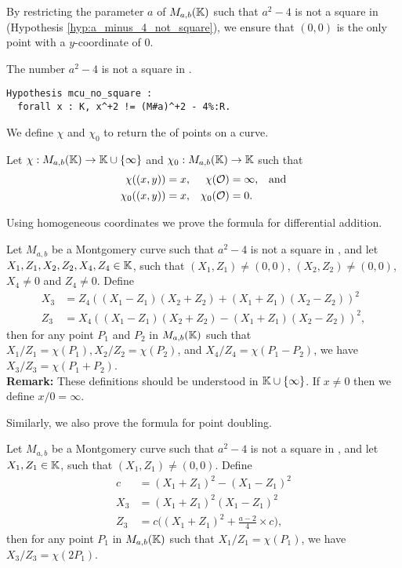 By restricting the parameter $a$ of $M_{a,b}(\mathbb{K})$ such that $a^2-4$ is not a
square in \K (Hypothesis \ref{hyp:a_minus_4_not_square}),
we ensure that $(0,0)$ is the only point with a $y$-coordinate of $0$.
\begin{hypothesis}
  \label{hyp:a_minus_4_not_square}
  The number $a^2-4$ is not a square in \K.
\end{hypothesis}
\begin{lstlisting}[language=Coq]
Hypothesis mcu_no_square :
  forall x : K, x^+2 != (M#a)^+2 - 4%:R.
\end{lstlisting}

We define $\chi$ and $\chi_0$ to return the \xcoord of points on a curve.
\begin{dfn}
    Let $\chi : M_{a,b}(\mathbb{K}) \to \mathbb{K} \cup \{\infty\}$ and $\chi_0 : M_{a,b}(\mathbb{K}) \to \mathbb{K}$ such that
    \begin{align*}
        \chi((x,y)) &= x, & \chi(\mathcal{O}) &= \infty, &&\text{and} \\
        \chi_0((x,y)) &= x, & \chi_0(\mathcal{O}) &= 0.
    \end{align*}
\end{dfn}

Using homogeneous coordinates we prove the formula for differential addition.%
\begin{lemma}
  \label{lemma:xADD}
  Let $M_{a,b}$ be a Montgomery curve such that $a^2-4$ is not a square in \K, and
  let $X_1, Z_1, X_2, Z_2, X_4, Z_4 \in \mathbb{K}$, such that $(X_1,Z_1) \neq (0,0)$,
  $(X_2,Z_2) \neq (0,0)$, $X_4 \neq 0$ and $Z_4 \neq 0$.
  Define
  \begin{align*}
    X_3 & = Z_4((X_1 - Z_1)(X_2+Z_2) + (X_1+Z_1)(X_2-Z_2))^2  \\
    Z_3 & = X_4((X_1 - Z_1)(X_2+Z_2) - (X_1+Z_1)(X_2-Z_2))^2,
  \end{align*}
  then for any point $P_1$ and $P_2$ in $M_{a,b}(\mathbb{K})$ such that
  $X_1/Z_1 = \chi(P_1), X_2/Z_2 = \chi(P_2)$, and $X_4/Z_4 = \chi(P_1 - P_2)$,
  we have $X_3/Z_3 = \chi(P_1+P_2)$.\\
  \textbf{Remark:}
  These definitions should be understood in $\mathbb{K} \cup \{\infty\}$.
  If $x\ne 0$ then we define $x/0 = \infty$.
\end{lemma}
Similarly, we also prove the formula for point doubling.%
\begin{lemma}
  \label{lemma:xDBL}
  Let $M_{a,b}$ be a Montgomery curve such that $a^2-4$ is not a square in \K, and
  let $X_1, Z_1 \in \mathbb{K}$, such that $(X_1,Z_1) \neq (0,0)$. Define
  \begin{align*}
    c   & = (X_1 + Z_1)^2 - (X_1 - Z_1)^2                   \\
    X_3 & = (X_1 + Z_1)^2(X_1-Z_1)^2                        \\
    Z_3 & = c\Big((X_1 + Z_1)^2+\frac{a-2}{4}\times c\Big),
  \end{align*}
  then for any point $P_1$ in $M_{a,b}(\mathbb{K})$ such that $X_1/Z_1 = \chi(P_1)$,
  we have $X_3/Z_3 = \chi(2P_1)$.
\end{lemma}


